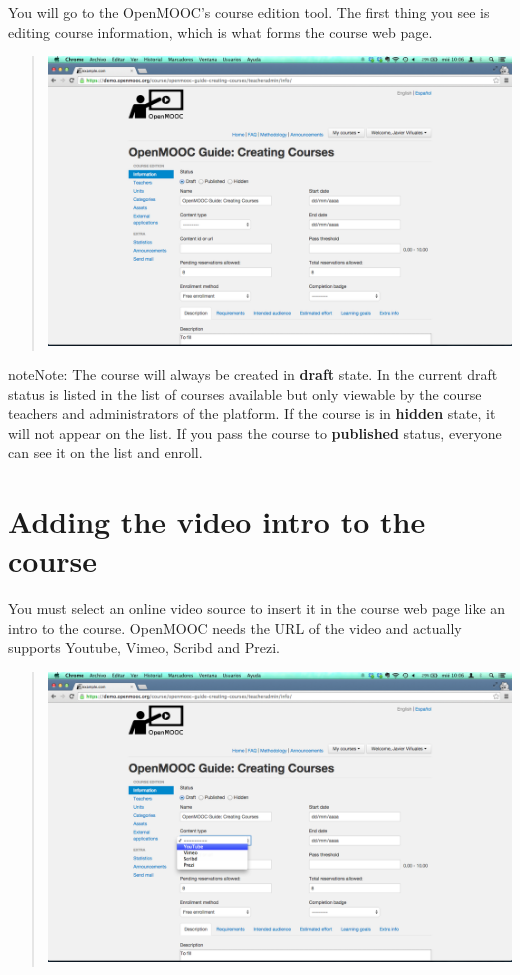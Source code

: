 \documentclass[letterpaper,10pt,english]{sphinxmanual}
\begin{document}
You will go to the OpenMOOC's course edition tool. The first thing you see is editing course information, which is what forms the course web page.
\begin{quote}

\includegraphics{2_course_information-1.png}
\end{quote}

\begin{notice}{note}{Note:}
The course will always be created in \textbf{draft} state. In the current
draft status is listed in the list of courses available but only viewable by
the course teachers and administrators of the platform. If the course is in \textbf{hidden} state,
it will not appear on the list. If you pass the course to \textbf{published} status, everyone can
see it on the list and enroll.
\end{notice}


\section{Adding the video intro to the course}
\label{course_page:adding-the-video-intro-to-the-course}
You must select an online video source to insert it in the course web page like an intro to the course. OpenMOOC needs the URL of the video and actually supports Youtube, Vimeo, Scribd and Prezi.
\begin{quote}

\includegraphics{2_course_information-2a.png}
\end{quote}
\end{document}
